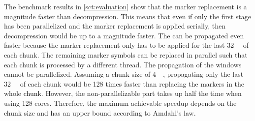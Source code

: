 The benchmark results in \cref{sct:evaluation} show that the marker replacement is a magnitude faster than  decompression.
This means that even if only the first stage has been parallelized and the marker replacement is applied serially, then decompression would be up to a magnitude faster. %
The \backrefwindows can be propagated even faster because the marker replacement only has to be applied for the last \SI{32}{\kibi\byte} of each chunk.
The remaining marker symbols can be replaced in parallel such that each chunk is processed by a different thread.
The propagation of the windows cannot be parallelized.
Assuming a chunk size of \SI{4}{\mebi\byte}, propagating only the last \SI{32}{\kibi\byte} of each chunk would be \num{128} times faster than replacing the markers in the whole chunk.
However, the non-parallelizable part takes up half the time when using \num{128} cores.
Therefore, the maximum achievable speedup depends on the chunk size and has an upper bound according to Amdahl's law.
